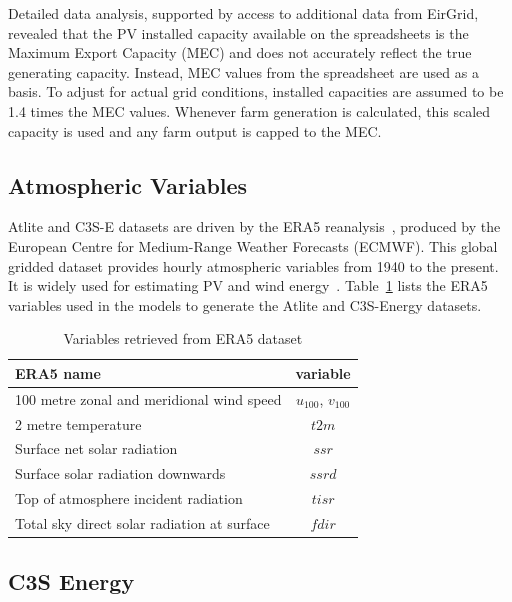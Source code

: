 \documentclass[a4paper, 11pt]{article}
\begin{document}
Detailed data analysis, supported by access to additional data from EirGrid, revealed that the PV installed capacity available on the spreadsheets is the Maximum Export Capacity (MEC) and does not accurately reflect the true generating capacity. Instead, MEC values from the spreadsheet are used as a basis. To adjust for actual grid conditions, installed capacities are assumed to be 1.4 times the MEC values. Whenever farm generation is calculated, this scaled capacity is used and any farm output is capped to the MEC.

\subsection{Atmospheric Variables}
\label{sec:era5}
 
Atlite and C3S-E datasets are driven by the ERA5 reanalysis~\cite{hersbach2020era5}, produced by the European Centre for Medium-Range Weather Forecasts (ECMWF). This global gridded dataset provides hourly atmospheric variables from 1940 to the present. It is widely used for estimating PV and wind energy~\cite{mockert2023drought, dubus2023energy, brown2021drought, otero2022drought}. Table~\ref{tab:var_name} lists the ERA5 variables used in the models to generate the Atlite and C3S-Energy datasets.

\begin{table}[h!]
	\centering
	\begin{tabular}{|l|c|}
		\hline
		{\textbf{ERA5 name}}      & \textbf{variable} \\ \hline
		100 metre zonal and meridional wind speed   & $u_{100}$, $v_{100}$ \\
		2 metre temperature                         & $t2m$ \\
		Surface net solar radiation                 & $ssr$ \\
		Surface solar radiation downwards           & $ssrd$  \\
		Top of atmosphere incident radiation        & $tisr$  \\
		Total sky direct solar radiation at surface & $fdir$  \\ \hline
	\end{tabular}
	\caption{Variables retrieved from ERA5 dataset}
	\label{tab:var_name}
\end{table}

\subsection{C3S Energy}
\label{sec:c3se}
\end{document}
